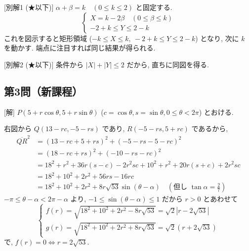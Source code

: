 \documentclass[../main.tex]{subfiles}
\begin{document}
[別解1 (★以下)]
$\alpha + \beta = k \quad (0 \le k \le 2)$ と固定する.
\[
  \begin{cases} X = k - 2\beta \quad (0 \le \beta \le k) \\ -2 + k \le Y \le 2 - k
  \end{cases}
\]
これを図示すると矩形領域 ($-k \le X \le k, \ -2+k \le Y \le 2-k$) となり, 次に $k$ を動かす. 端点に注目すれば同じ結果が得られる.

[別解2 (★以下)]
条件から $|X| + |Y| \le 2$ だから, 直ちに同図を得る.

\newpage

\subsection*{第3問（新課程）}

[解] $P(5 + r\cos\theta, 5 + r\sin\theta)$ ($c = \cos\theta, s = \sin\theta, 0 \le \theta < 2\pi$) とおける.

右図から $Q(13 - r c, -5 - r s)$ であり, $R(-5 - r s, 5 + r c)$ であるから,
\[
  \begin{aligned}
    \overline{QR}^2 &= (13 - r c + 5 + r s)^2 + (-5 - r s - 5 - r c)^2 \\
    &= (18 - r c + r s)^2 + (-10 - r s - r c)^2 \\
    &= 18^2 + r^2 + 36 r (s - c) - 2 r^2 s c + 10^2 + r^2 + 20 r (s + c) + 2 r^2 s c \\
    &= 18^2 + 10^2 + 2 r^2 + 56 r s - 16 r c \\
    &= 18^2 + 10^2 + 2 r^2 + 8 r \sqrt{53} \sin(\theta - \alpha) \quad \left( \text{但し } \tan\alpha = \frac{2}{7} \right)
  \end{aligned}
\]
$-\pi \le \theta - \alpha < 2\pi - \alpha$ より, $-1 \le \sin(\theta - \alpha) \le 1$ だから $r > 0$ とあわせて
\[
  \begin{cases}
    f(r) = \sqrt{18^2 + 10^2 + 2r^2 - 8r\sqrt{53}} = \sqrt{2} |r - 2\sqrt{53}| \\
    g(r) = \sqrt{18^2 + 10^2 + 2r^2 + 8r\sqrt{53}} = \sqrt{2} (r + 2\sqrt{53})
  \end{cases}
\]
で, $f(r) = 0 \iff r = 2\sqrt{53}$.

\newpage

\end{document}
